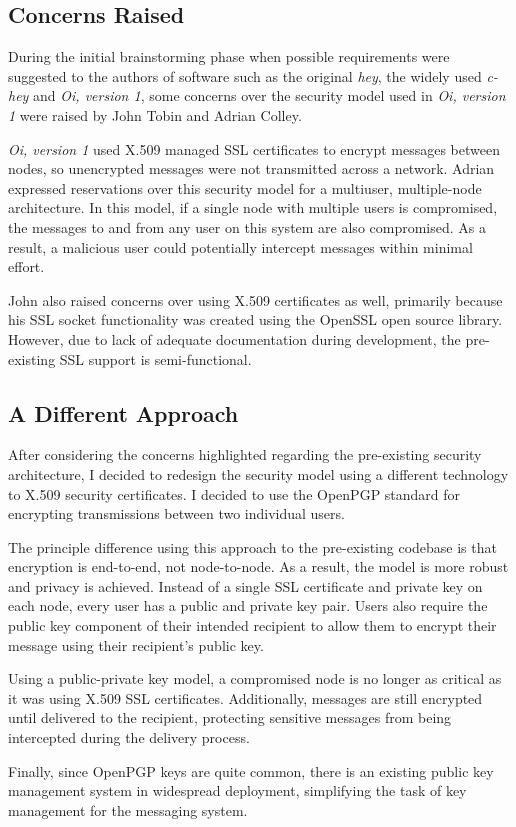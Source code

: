 
\subsection{Concerns Raised}

During the initial brainstorming phase when possible requirements were
suggested to the authors of software such as the original \emph{hey},
the widely used \emph{c-hey} and \emph{Oi, version 1}, some concerns 
over the security model used in \emph{Oi, version 1} were raised by 
John Tobin and Adrian Colley. 


\emph{Oi, version 1} used X.509 managed SSL certificates to encrypt 
messages between nodes, so unencrypted messages were not transmitted 
across a network. Adrian expressed reservations over this security model 
for a multiuser, multiple-node architecture. In this model, if a
single node with multiple users is compromised, the messages to and from
any user on this system are also compromised. As a result, a malicious
user could potentially intercept messages within minimal effort.


John also raised concerns over using X.509 certificates as well,
primarily because his SSL socket functionality was created using the
OpenSSL open source library. However, due to lack of adequate
documentation during development, the pre-existing SSL support is
semi-functional.

\subsection{A Different Approach}

After considering the concerns highlighted regarding the pre-existing
security architecture, I decided to redesign the security model using a
different technology to X.509 security certificates. I decided to use the 
OpenPGP standard for encrypting transmissions between two individual 
users.


The principle difference using this approach to the pre-existing
codebase is that encryption is end-to-end, not node-to-node. As a
result, the model is more robust and privacy is achieved. Instead of a
single SSL certificate and private key on each node, every user has a
public and private key pair. Users also require the public key component
of their intended recipient to allow them to encrypt their message using
their recipient's public key.


Using a public-private key model, a compromised node is no longer as
critical as it was using X.509 SSL certificates. Additionally, messages
are still encrypted until delivered to the recipient, protecting
sensitive messages from being intercepted during the delivery process.


Finally, since OpenPGP keys are quite common, there is an existing
public key management system in widespread deployment, simplifying the
task of key management for the messaging system.
